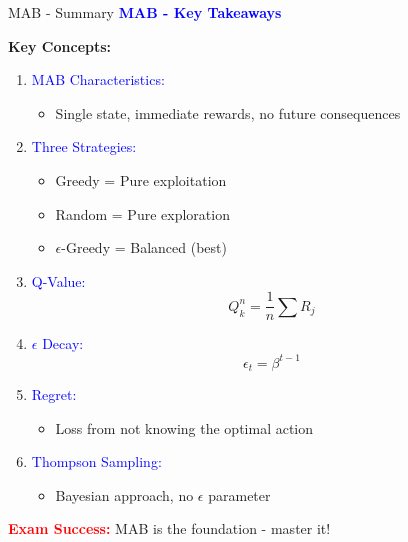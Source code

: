 \documentclass[8pt]{beamer}
\begin{document}
\begin{frame}{MAB - Summary}
\fontsize{6.5}{7.5}\selectfont
\textcolor{blue}{\textbf{MAB - Key Takeaways}}

\textbf{Key Concepts:}
\begin{enumerate}
\item \textcolor{blue}{MAB Characteristics:}
\begin{itemize}
\item Single state, immediate rewards, no future consequences
\end{itemize}

\item \textcolor{blue}{Three Strategies:}
\begin{itemize}
\item Greedy = Pure exploitation
\item Random = Pure exploration
\item $\epsilon$-Greedy = Balanced (best)
\end{itemize}

\item \textcolor{blue}{Q-Value:}
\[
Q_k^n = \frac{1}{n}\sum R_j
\]

\item \textcolor{blue}{$\epsilon$ Decay:}
\[
\epsilon_t = \beta^{t-1}
\]

\item \textcolor{blue}{Regret:}
\begin{itemize}
\item Loss from not knowing the optimal action
\end{itemize}

\item \textcolor{blue}{Thompson Sampling:}
\begin{itemize}
\item Bayesian approach, no $\epsilon$ parameter
\end{itemize}
\end{enumerate}

\textcolor{red}{\textbf{Exam Success:}} MAB is the foundation - master it!
\end{frame}

\end{document}
